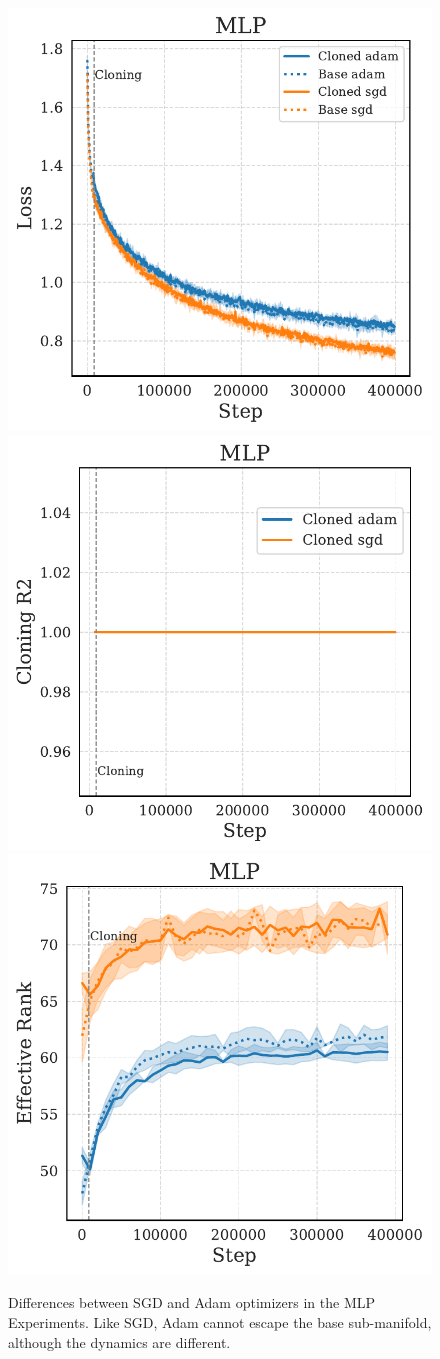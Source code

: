 \documentclass{article}
\numberwithin{figure}{section}
\begin{document}
\begin{figure}
    \centering
    \includegraphics[width=0.3\linewidth]{paper/images/mlp_optimizer_cloning_losses_plot.pdf}
    \includegraphics[width=0.3\linewidth]{paper/images/mlp_optimizer_cloning_r2_plot.pdf}
    \includegraphics[width=0.3\linewidth]{paper/images/mlp_optimizer_cloning_rank_plot.pdf}
    \caption{Differences between SGD and Adam optimizers in the MLP Experiments. Like SGD, Adam cannot escape the base sub-manifold, although the dynamics are different.}
    \label{fig:enter-label}
\end{figure}
\end{document}
